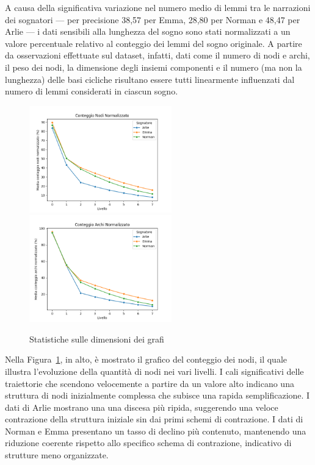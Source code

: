 A causa della significativa variazione nel numero medio di lemmi tra le narrazioni dei sognatori — per precisione 38,57
per Emma, 28,80 per Norman e 48,47 per Arlie — i dati sensibili alla lunghezza del sogno sono stati normalizzati a un
valore percentuale relativo al conteggio dei lemmi del sogno originale.
A partire da osservazioni effettuate sul dataset, infatti, dati come il numero di nodi e archi, il peso dei nodi,
la dimensione degli insiemi componenti e il numero (ma non la lunghezza) delle basi cicliche risultano essere tutti
linearmente influenzati dal numero di lemmi considerati in ciascun sogno.

\newpage

\begin{figure}
    \vspace{-5pt}
    \includegraphics[width=0.55\textwidth]{Immagini/conteggio_nodi_normalizzato}
    \includegraphics[width=0.55\textwidth]{Immagini/conteggio_archi_normalizzato}
    \caption{Statistiche sulle dimensioni dei grafi}\label{fig:node_edge_count}
    \vspace{-5pt}
\end{figure}

Nella Figura~\ref{fig:node_edge_count}, in alto, è mostrato il grafico del conteggio dei nodi, il quale illustra
l'evoluzione della quantità di nodi nei vari livelli.
I cali significativi delle traiettorie che scendono velocemente a partire da un valore alto indicano una struttura
di nodi inizialmente complessa che subisce una rapida semplificazione.
I dati di Arlie mostrano una una discesa più ripida, suggerendo una veloce contrazione della struttura iniziale sin
dai primi schemi di contrazione.
I dati di Norman e Emma presentano un tasso di declino più contenuto, mantenendo una riduzione coerente rispetto
allo specifico schema di contrazione, indicativo di strutture meno organizzate.

